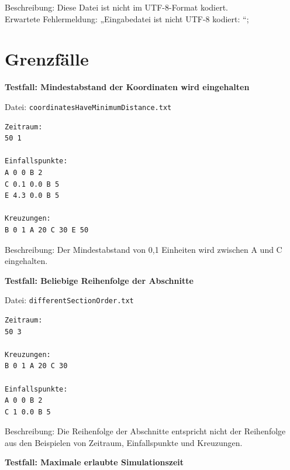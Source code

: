 \begin{figure}[h!]
    \centering
\end{figure}

Beschreibung: Diese Datei ist nicht im UTF-8-Format kodiert. \\
Erwartete Fehlermeldung: „Eingabedatei ist nicht UTF-8 kodiert: “;
\clearpage
\section{Grenzfälle}

\textbf{Testfall: Mindestabstand der Koordinaten wird eingehalten}

Datei: \texttt{coordinatesHaveMinimumDistance.txt}
\begin{lstlisting}
Zeitraum:
50 1

Einfallspunkte:
A 0 0 B 2
C 0.1 0.0 B 5
E 4.3 0.0 B 5

Kreuzungen:
B 0 1 A 20 C 30 E 50
\end{lstlisting}

Beschreibung: Der Mindestabstand von 0{,}1 Einheiten wird zwischen A und C eingehalten.

\textbf{Testfall: Beliebige Reihenfolge der Abschnitte}

Datei: \texttt{differentSectionOrder.txt}
\begin{lstlisting}
Zeitraum:
50 3

Kreuzungen:
B 0 1 A 20 C 30

Einfallspunkte:
A 0 0 B 2
C 1 0.0 B 5
\end{lstlisting}

Beschreibung: Die Reihenfolge der Abschnitte entspricht nicht der Reihenfolge aus den Beispielen von Zeitraum, Einfallspunkte und Kreuzungen.

\textbf{Testfall: Maximale erlaubte Simulationszeit}

